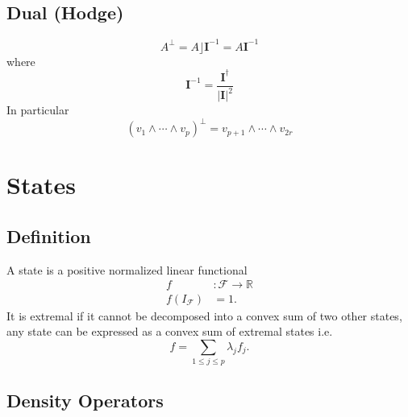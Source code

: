 \documentclass[aps,preprint]{revtex4}%
\begin{document}
\subsection{Dual (Hodge)}%

\begin{equation}
A^{\bot}=A\rfloor\mathbf{I}^{-1}=A\mathbf{I}^{-1}%
\end{equation}
where
\begin{equation}
\mathbf{I}^{-1}=\frac{\mathbf{I}^{\dagger}}{\left\vert \mathbf{I}\right\vert
^{2}}%
\end{equation}
In particular
\begin{equation}
\left(  v_{1}\wedge\cdots\wedge v_{p}\right)  ^{\bot}=v_{p+1}\wedge
\cdots\wedge v_{2r}%
\end{equation}


\section{States}

\subsection{Definition}

\qquad A state is a positive normalized linear functional
\begin{align}
f  &  :\mathcal{F\rightarrow}\mathbb{R}\\
f\left(  I_{\mathcal{F}}\right)   &  =1.
\end{align}
It is extremal if it cannot be decomposed into a convex sum of two other
states, any state can be expressed as a convex sum of extremal states i.e.
\begin{equation}
f=\sum_{1\leq j\leq p}\lambda_{j}f_{j}.
\end{equation}


\subsection{Density Operators}
\end{document}
